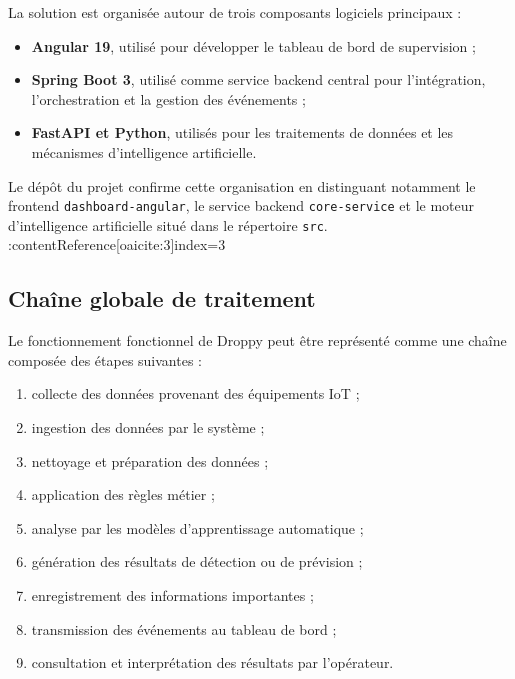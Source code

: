 La solution est organisée autour de trois composants logiciels principaux :

\begin{itemize}

    \item \textbf{Angular 19}, utilisé pour développer le tableau de bord
    de supervision ;

    \item \textbf{Spring Boot 3}, utilisé comme service backend central pour
    l'intégration, l'orchestration et la gestion des événements ;

    \item \textbf{FastAPI et Python}, utilisés pour les traitements de
    données et les mécanismes d'intelligence artificielle.

\end{itemize}

Le dépôt du projet confirme cette organisation en distinguant notamment
le frontend \texttt{dashboard-angular}, le service backend
\texttt{core-service} et le moteur d'intelligence artificielle situé dans
le répertoire \texttt{src}. :contentReference[oaicite:3]{index=3}

\subsection{Chaîne globale de traitement}

Le fonctionnement fonctionnel de Droppy peut être représenté comme une
chaîne composée des étapes suivantes :

\begin{enumerate}

    \item collecte des données provenant des équipements IoT ;

    \item ingestion des données par le système ;

    \item nettoyage et préparation des données ;

    \item application des règles métier ;

    \item analyse par les modèles d'apprentissage automatique ;

    \item génération des résultats de détection ou de prévision ;

    \item enregistrement des informations importantes ;

    \item transmission des événements au tableau de bord ;

    \item consultation et interprétation des résultats par l'opérateur.

\end{enumerate}

